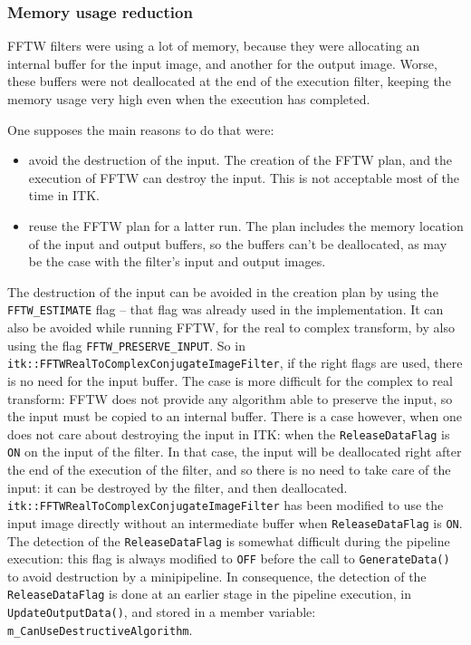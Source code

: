 \documentclass{InsightArticle}
\begin{document}
\subsubsection{Memory usage reduction}

FFTW filters were using a lot of memory, because they were allocating an internal buffer for the input 
image, and another for the output image. Worse, these buffers were not deallocated at the end of
the execution filter, keeping the memory usage very high even when the execution has completed.

One supposes the main reasons to do that were:
\begin{itemize}
  \item avoid the destruction of the input. The creation of the FFTW plan, and the execution of FFTW 
  can destroy the input. This is not acceptable most of the time in ITK.
  \item reuse the FFTW plan for a latter run. The plan includes the memory location of the input and output
  buffers, so the buffers can't be deallocated, as may be the case with the filter's input and output images.
\end{itemize}

The destruction of the input can be avoided in the creation plan by using the \verb$FFTW_ESTIMATE$ flag
-- that flag was already used in the implementation. It can also be avoided while running FFTW, for 
the real to complex transform, by also using the flag \verb$FFTW_PRESERVE_INPUT$. So in 
\verb$itk::FFTWRealToComplexConjugateImageFilter$, if the right flags are used, there is no need for
the input buffer.
The case is
more difficult for the complex to real transform: FFTW does not provide any algorithm able to preserve
the input, so the input must be copied to an internal buffer. There is a case however, when one does not
care about destroying the input in ITK: when the \verb$ReleaseDataFlag$ is \verb$ON$ on the input of the filter.
In that case, the input will be deallocated right after the end of the execution of the filter, and so
there is no need to take care of the input: it can be destroyed by the filter, and then deallocated.
\verb$itk::FFTWRealToComplexConjugateImageFilter$ has been modified to use the input image directly without an
intermediate buffer when \verb$ReleaseDataFlag$ is \verb$ON$. The detection of the \verb$ReleaseDataFlag$
is somewhat difficult during the pipeline 
execution: this flag is always modified to \verb$OFF$ before the call to \verb$GenerateData()$ to avoid
destruction by a minipipeline. In consequence, the detection of the \verb$ReleaseDataFlag$ is done at an 
earlier stage in the pipeline execution, in \verb$UpdateOutputData()$, and stored in a member variable:
\verb$m_CanUseDestructiveAlgorithm$.
\end{document}
